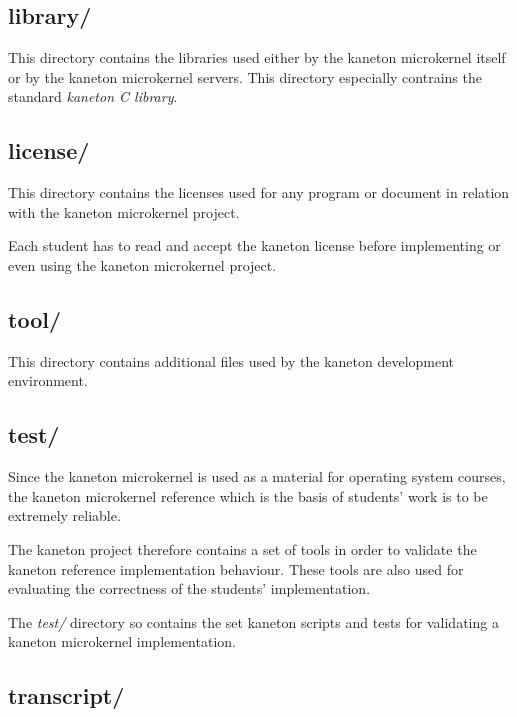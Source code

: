 \subsection*{library/}

This directory contains the libraries used either by the kaneton microkernel
itself or by the kaneton microkernel servers. This directory especially
contrains the standard \textit{kaneton C library}.

%
%

\subsection*{license/}

This directory contains the licenses used for any program or document
in relation with the kaneton microkernel project.

Each student has to read and accept the kaneton license before implementing
or even using the kaneton microkernel project.

%
%

\subsection*{tool/}

This directory contains additional files used by the kaneton development
environment.

%
%

\subsection*{test/}

Since the kaneton microkernel is used as a material for operating system
courses, the kaneton microkernel reference which is the basis of students'
work is to be extremely reliable.

The kaneton project therefore contains a set of tools in order to validate
the kaneton reference implementation behaviour. These tools are also used
for evaluating the correctness of the students' implementation.

The \textit{test/} directory so contains the set kaneton scripts and tests
for validating a kaneton microkernel implementation.

%
%

\subsection*{transcript/}


